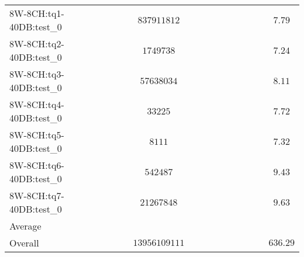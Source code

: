 \begin{tabular}{|l|c|c|c|c|c|c|c|c|c|c|c|}
8W-8CH:tq1-40DB:test\_0   & $          $ & $ 837911812   $ & $       $ & $  $ & $    $ & $       $ & $  $ & $   $ & $             $ & $         $ & $ 7.79    $ \\
8W-8CH:tq2-40DB:test\_0   & $          $ & $ 1749738     $ & $       $ & $  $ & $    $ & $       $ & $  $ & $   $ & $             $ & $         $ & $ 7.24    $ \\
8W-8CH:tq3-40DB:test\_0   & $          $ & $ 57638034    $ & $       $ & $  $ & $    $ & $       $ & $  $ & $   $ & $             $ & $         $ & $ 8.11    $ \\
8W-8CH:tq4-40DB:test\_0   & $          $ & $ 33225       $ & $       $ & $  $ & $    $ & $       $ & $  $ & $   $ & $             $ & $         $ & $ 7.72    $ \\
8W-8CH:tq5-40DB:test\_0   & $          $ & $ 8111        $ & $       $ & $  $ & $    $ & $       $ & $  $ & $   $ & $             $ & $         $ & $ 7.32    $ \\
8W-8CH:tq6-40DB:test\_0   & $          $ & $ 542487      $ & $       $ & $  $ & $    $ & $       $ & $  $ & $   $ & $             $ & $         $ & $ 9.43    $ \\
8W-8CH:tq7-40DB:test\_0   & $          $ & $ 21267848    $ & $       $ & $  $ & $    $ & $       $ & $  $ & $   $ & $             $ & $         $ & $ 9.63    $ \\
\hline
Average                   & $          $ & $             $ & $       $ & $  $ & $    $ & $       $ & $  $ & $   $ & $             $ & $         $ & $         $ \\
\hline
Overall                   & $          $ & $ 13956109111 $ & $       $ & $  $ & $    $ & $       $ & $  $ & $   $ & $             $ & $         $ & $ 636.29  $ \\
\hline
\end{tabular}
